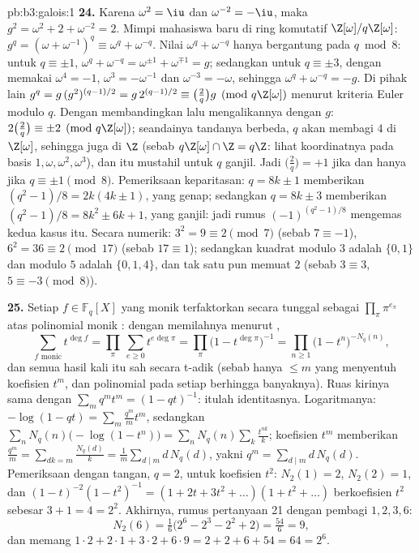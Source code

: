 \begin{solution}{pb:b3:galois:1}
\textbf{24.} Karena $\omega^2 = \iu$ dan $\omega^{-2} = -\iu$, maka
$g^2 = \omega^2 + 2 + \omega^{-2} = 2$. Mimpi mahasiswa baru di
ring komutatif $\Z[\omega]/q\Z[\omega]$: $g^q =
(\omega + \omega^{-1})^q \equiv \omega^q + \omega^{-q}$. Nilai
$\omega^q + \omega^{-q}$ hanya bergantung pada $q \bmod 8$:
untuk $q \equiv \pm1$, $\omega^q + \omega^{-q} = \omega^{\pm1} +
\omega^{\mp1} = g$; sedangkan untuk $q \equiv \pm3$, dengan memakai $\omega^4 =
-1$, $\omega^{3} = -\omega^{-1}$ dan $\omega^{-3} = -\omega$,
sehingga $\omega^q + \omega^{-q} = -g$. Di pihak lain $g^q =
g\,(g^2)^{(q-1)/2} = g\,2^{(q-1)/2} \equiv \bigl(\frac2q\bigr)
g \pmod{q\Z[\omega]}$ menurut kriteria Euler modulo $q$. Dengan membandingkan
lalu mengalikannya dengan $g$: $2\bigl(\frac2q\bigr) \equiv
\pm2 \pmod{q\Z[\omega]}$; seandainya tandanya berbeda, $q$ akan
membagi $4$ di $\Z[\omega]$, sehingga juga di $\Z$ (sebab $q\Z[\omega] \cap
\Z = q\Z$: lihat koordinatnya pada basis $1, \omega, \omega^2,
\omega^3$), dan itu mustahil untuk $q$ ganjil. Jadi $\bigl(\frac2q\bigr) =
+1$ jika dan hanya jika $q \equiv \pm1 \pmod 8$. Pemeriksaan keparitasan: $q = 8k \pm 1$
memberikan $(q^2 - 1)/8 = 2k(4k \pm 1)$, yang genap; sedangkan $q = 8k \pm 3$
memberikan $(q^2 - 1)/8 = 8k^2 \pm 6k + 1$, yang ganjil: jadi rumus
$(-1)^{(q^2-1)/8}$ mengemas kedua kasus itu. Secara numerik: $3^2
= 9 \equiv 2 \pmod 7$ (sebab $7 \equiv -1$), $6^2 = 36 \equiv 2
\pmod{17}$ (sebab $17 \equiv 1$); sedangkan kuadrat modulo $3$ adalah $\{0,
1\}$ dan modulo $5$ adalah $\{0, 1, 4\}$, dan tak satu pun memuat $2$
(sebab $3 \equiv 3$, $5 \equiv -3 \pmod 8$).

\textbf{25.} Setiap $f \in \mathbb F_q[X]$ yang monik terfaktorkan
secara tunggal sebagai $\prod_\pi\pi^{e_\pi}$ atas polinomial monik
: dengan memilahnya menurut ,
\[
\sum_{f \text{ monic}}t^{\deg f}
= \prod_\pi\ \sum_{e \geq 0}t^{e\deg\pi}
= \prod_\pi\bigl(1 - t^{\deg\pi}\bigr)^{-1}
= \prod_{n \geq 1}\bigl(1 - t^n\bigr)^{-N_q(n)},
\]
dan semua hasil kali itu sah secara t-adik (sebab hanya  $\leq m$
yang menyentuh koefisien $t^m$, dan polinomial  pada setiap 
berhingga banyaknya). Ruas kirinya sama dengan $\sum_m
q^mt^m = (1 - qt)^{-1}$: itulah identitasnya. Logaritmanya: $-\log(1 -
qt) = \sum_m\frac{q^m}mt^m$, sedangkan $\sum_nN_q(n)\bigl(-\log(1
- t^n)\bigr) = \sum_nN_q(n)\sum_k\frac{t^{nk}}k$; koefisien
$t^m$ memberikan $\frac{q^m}m = \sum_{dk = m}
\frac{N_q(d)}k = \frac1m\sum_{d \mid m}d\,N_q(d)$, yakni
$q^m = \sum_{d\mid m}d\,N_q(d)$. Pemeriksaan dengan tangan, $q = 2$,
untuk koefisien $t^2$: $N_2(1) = 2$, $N_2(2) = 1$, dan
$(1 - t)^{-2}(1 - t^2)^{-1} = (1 + 2t + 3t^2 + \dots)(1 + t^2
+ \dots)$ berkoefisien $t^2$ sebesar $3 + 1 = 4 = 2^2$. Akhirnya,
rumus pertanyaan 21 dengan pembagi $1, 2, 3, 6$:
\[
N_2(6) = \tfrac16\bigl(2^6 - 2^3 - 2^2 + 2\bigr)
= \tfrac{54}6 = 9,
\]
dan memang $1\cdot2 + 2\cdot1 + 3\cdot2 + 6\cdot9 = 2 + 2 +
6 + 54 = 64 = 2^6$.

\end{solution}
